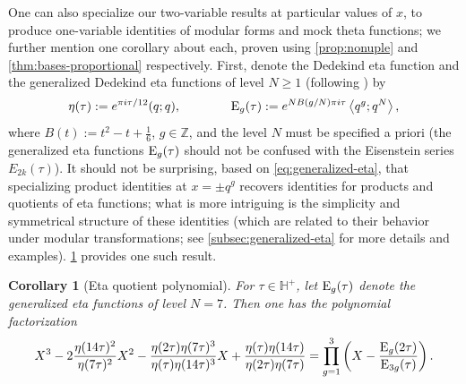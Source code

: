 \documentclass[reqno,11pt]{amsart}
\newtheorem{corollary}[theorem]{Corollary}
\theoremstyle{definition}
\theoremstyle{remark}
\newtheorem*{remark}{Remark}
\numberwithin{equation}{section}
\newcommand{\Z}{\mathbb{Z}}
\renewcommand{\H}{{\mathbb{H}}}
\newcommand{\E}{\textnormal E}
\newcommand{\la}{\left\langle}
\newcommand{\ra}{\right\rangle}
\begin{document}


One can also specialize our two-variable results at particular values of $x$, to produce one-variable identities of modular forms and mock theta functions; we further mention one corollary about each, proven using \cref{prop:nonuple} and \cref{thm:bases-proportional} respectively. First, denote the Dedekind eta function and the generalized Dedekind eta functions of level $N \ge 1$ (following \cite[Corollary 2]{yang2004transformation}) by
\begin{equation} \label{eq:generalized-eta}
    \eta(\tau) := e^{\pi i \tau / 12}(q; q),
    \qquad\qquad 
    \E_g(\tau) := e^{N B(g/N) \pi i \tau} \la q^g; q^N \ra,
\end{equation}
where $B(t) := t^2 - t + \frac{1}{6}$, $g \in \Z$, and the level $N$ must be specified a priori (the generalized eta functions $\E_g(\tau)$ should not be confused with the Eisenstein series $E_{2k}(\tau)$). It should not be surprising, based on \cref{eq:generalized-eta}, that specializing product identities at $x = \pm q^g$ recovers identities for products and quotients of eta functions; what is more intriguing is the simplicity and symmetrical structure of these identities (which are related to their behavior under modular transformations; see \cref{subsec:generalized-eta} for more details and examples). \cref{cor:eta-poly} provides one such result.

\begin{corollary}[Eta quotient polynomial]\label{cor:eta-poly}
For $\tau \in \H^+$, let $\E_g(\tau)$ denote the generalized eta functions of level $N = 7$. Then one has the polynomial factorization
\[
    X^3
    - 2\frac{\eta(14\tau)^2}{\eta(7\tau)^2} X^2
    - \frac{\eta(2\tau)\eta(7\tau)^3}{\eta(\tau)\eta(14\tau)^3} X
    + \frac{\eta(\tau)\eta(14\tau)}{\eta(2\tau)\eta(7\tau)}
    = \prod_{g = 1}^3 \left(X - \frac{\E_{g}(2\tau)}{\E_{3g}(\tau)}\right).
\]
\end{corollary}
\end{document}
